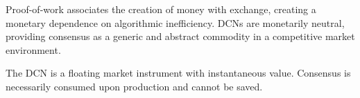\documentclass[twocolumn, aps, amsmath, amssymb, nofootinbib, superscriptaddress, longbibliography, floatfix, eqsecnum, rmp]{revtex4-2}
\begin{document}
Proof-of-work associates the creation of money with exchange, creating a monetary dependence on algorithmic inefficiency. DCNs are monetarily neutral, providing consensus as a generic and abstract commodity in a competitive market environment.

The DCN is a floating market instrument with instantaneous value. Consensus is necessarily consumed upon production and cannot be saved.








\end{document}
